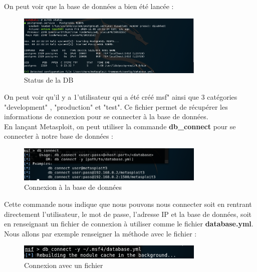  On peut voir que la base de données a bien été lancée :

\begin{figure}[htp!]
  \centering
  \setlength\figureheight{7cm}
  \setlength\figurewidth{9cm}
  \includegraphics[width=0.8\textwidth]{oui/Ancien/imangeancien/metasploit/db_status1.PNG}
  \caption{Status de la DB}
  \label{fig:courbe-tikz}
\end{figure}

 On peut voir qu'il y a 1'utilisateur qui a été créé msf" ainsi que 3 catégories "development" , "production" et "test". Ce fichier permet de récupérer les informations de connexion pour se connecter à la base de données.\\

 En lançant Metasploit, on peut utiliser la commande \textbf{db\_connect} pour se connecter à notre base de données :

\begin{figure}[htp!]
  \centering
  \setlength\figureheight{7cm}
  \setlength\figurewidth{9cm}
  \includegraphics[width=0.8\textwidth]{oui/Ancien/imangeancien/metasploit/db_connect.PNG}
  \caption{Connexion à la base de données}
  \label{fig:courbe-tikz}
\end{figure}
 Cette commande nous indique que nous pouvons nous connecter soit en rentrant directement l'utilisateur, le mot de passe, l'adresse IP et la base de données, soit en renseignant un fichier de connexion à utiliser comme le fichier \textbf{database.yml}.\\

 Nous allons par exemple renseigner la méthode avec le fichier :

\begin{figure}[htp!]
  \centering
  \setlength\figureheight{7cm}
  \setlength\figurewidth{9cm}
  \includegraphics[width=0.8\textwidth]{oui/Ancien/imangeancien/metasploit/db_connect2.PNG}
  \caption{Connexion avec un fichier}
  \label{fig:courbe-tikz}
\end{figure}

